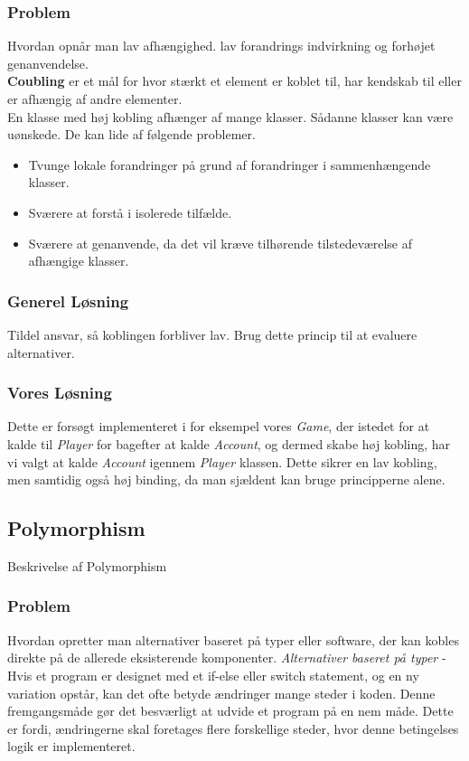 \subsubsection*{Problem}
Hvordan opnår man lav afhængighed. lav forandrings indvirkning og forhøjet genanvendelse.
\\
\textbf{Coubling} er et mål for hvor stærkt et element er koblet til, har kendskab til eller er afhængig af andre elementer.
\\
En klasse med høj kobling afhænger af mange klasser. Sådanne klasser kan være uønskede. De kan lide af følgende problemer.
\begin{itemize}
\item Tvunge lokale forandringer på grund af forandringer i sammenhængende klasser.
\item Sværere at forstå i isolerede tilfælde.
\item Sværere at genanvende, da det vil kræve tilhørende tilstedeværelse af afhængige klasser.
\end{itemize}
\subsubsection*{Generel Løsning}
Tildel ansvar, så koblingen forbliver lav. Brug dette princip til at evaluere alternativer.
\subsubsection*{Vores Løsning}
Dette er forsøgt implementeret i for eksempel vores \textit{Game}, der istedet for at kalde til  \textit{Player} for bagefter at kalde \textit{Account}, og dermed skabe høj kobling, har vi valgt at kalde \textit{Account} igennem \textit{Player} klassen. Dette sikrer en lav kobling, men samtidig også høj binding, da man sjældent kan bruge principperne alene.
\subsection{Polymorphism}
Beskrivelse af Polymorphism
\subsubsection*{Problem}
Hvordan opretter man alternativer baseret på typer eller software, der kan kobles direkte på de allerede eksisterende komponenter.
\textit{Alternativer baseret på typer} - Hvis et program er designet med et if-else eller switch statement, og en ny variation opstår, kan det ofte betyde ændringer mange steder i koden. Denne fremgangsmåde gør det besværligt at udvide et program på en nem måde. Dette er fordi, ændringerne skal foretages flere forskellige steder, hvor denne betingelses logik er implementeret.
